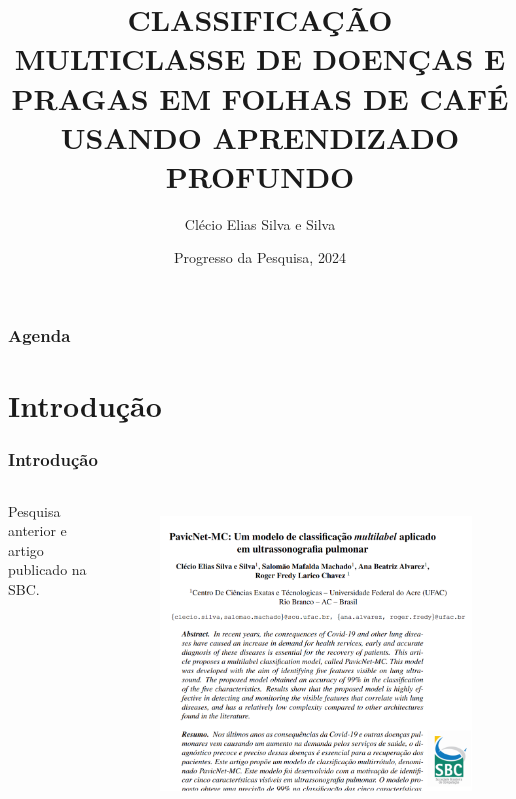 \documentclass[aspectratio=169]{beamer}
\title[Multi - Classification] %
{CLASSIFICAÇÃO MULTICLASSE DE DOENÇAS E PRAGAS EM FOLHAS DE CAFÉ USANDO APRENDIZADO PROFUNDO}
\author[Clécio Elias] %
{Clécio Elias Silva e Silva}
\institute[UFAC] %
{
  Centro de Ciências Exatas e Tecnológicas\\
  Universidade Federal do Acre
}
\date[Progresso da Pesqusia] %
{Progresso da Pesquisa, 2024}
\begin{document}
\frame{\titlepage}


\begin{frame}
    \frametitle{Agenda}
    \tableofcontents
\end{frame}

\section{Introdução}




\begin{frame}
    \frametitle{Introdução}
    \begin{columns}


        Pesquisa anterior e artigo publicado na SBC.

        \begin{figure}
            \centering
            \includegraphics[scale=0.3]{img/Artigo.png}
            \label{fig:enter-label}
        \end{figure}


    \end{columns}
\end{frame}
\end{document}
